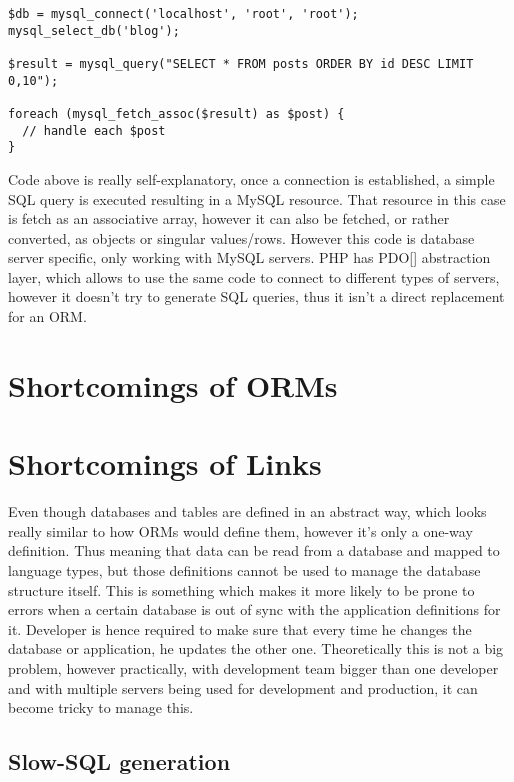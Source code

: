 \begin{codelisting}
\begin{verbatim}
$db = mysql_connect('localhost', 'root', 'root');
mysql_select_db('blog');

$result = mysql_query("SELECT * FROM posts ORDER BY id DESC LIMIT 0,10");

foreach (mysql_fetch_assoc($result) as $post) {
  // handle each $post
}
\end{verbatim}
\end{codelisting}

Code above is really self-explanatory, once a connection is established, a simple SQL query is executed resulting in a MySQL resource. That resource in this case is fetch as an associative array, however it can also be fetched, or rather converted, as objects or singular values/rows. However this code is database server specific, only working with MySQL servers. PHP has PDO[] abstraction layer, which allows to use the same code to connect to different types of servers, however it doesn't try to generate SQL queries, thus it isn't a direct replacement for an ORM.

\section{Shortcomings of ORMs}

\section{Shortcomings of Links}

Even though databases and tables are defined in an abstract way, which looks really similar to how ORMs would define them, however it's only a one-way definition. Thus meaning that data can be read from a database and mapped to language types, but those definitions cannot be used to manage the database structure itself. This is something which makes it more likely to be prone to errors when a certain database is out of sync with the application definitions for it. Developer is hence required to make sure that every time he changes the database or application, he updates the other one. Theoretically this is not a big problem, however practically, with development team bigger than one developer and with multiple servers being used for development and production, it can become tricky to manage this. 

\subsection{Slow-SQL generation}


